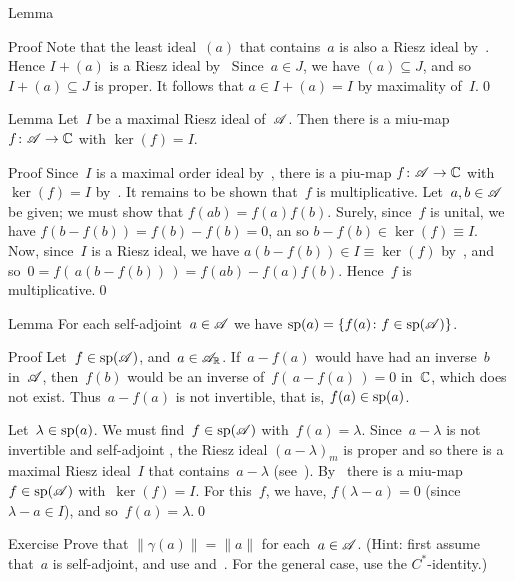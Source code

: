 \documentclass[main]{subfiles}
\begin{document}
\begin{parsec}
\begin{point}{Lemma}
\begin{point}{Proof}
Note that the least ideal~$(a)$ that contains~$a$
is also a Riesz ideal by~.
Hence  $I+(a)$ is a Riesz ideal by~
Since~$a\in J$, we have $(a)\subseteq J$,
and so~$I+(a)\subseteq J$ is proper.
It follows that $a\in I+(a)=I$ by maximality of~$I$.\qed
\end{point}
\end{point}
\begin{point}{Lemma}%
Let~$I$ be a maximal Riesz ideal of~$\mathscr{A}$.
Then there is a miu-map $f\colon \mathscr{A}\to \mathbb{C}$
with $\ker(f)=I$.
\begin{point}{Proof}%
Since~$I$ is a maximal order ideal 
by~,
there is a piu-map $f\colon \mathscr{A}\to \mathbb{C}$
with~$\ker(f)=I$ by~.
It remains to be shown that~$f$ is multiplicative.
Let~$a,b\in \mathscr{A}$ be given;
we must show that $f(ab)=f(a)f(b)$.
Surely, since~$f$ is unital,
we have $f(b-f(b))=f(b)-f(b)=0$,
an so $b-f(b)\in \ker(f)\equiv I$.
Now, since~$I$ is a Riesz ideal,
we have $a(b-f(b))\in I\equiv \ker(f)$ by~,
and so~$0=f(\,a(b-f(b))\,)=f(ab)-f(a)f(b)$.
Hence~$f$ is multiplicative.\qed
\end{point}
\end{point}
\begin{point}{Lemma}%
For each self-adjoint~$a\in\mathscr{A}$ 
we have $\mathrm{sp}(a)=\{f(a)\colon f\in\mathrm{sp}(\mathscr{A})\}$.
\begin{point}{Proof}%
Let~$f\in \mathrm{sp}(\mathscr{A})$,
and~$a\in\mathscr{A}_{\mathbb{R}}$.
If~$a-f(a)$ would have had an inverse~$b$ in~$\mathscr{A}$,
then~$f(b)$ would be an inverse
of~$f(\,a-f(a)\,)=0$ in~$\mathbb{C}$,
which does not exist. Thus~$a-f(a)$ is not invertible,
that is, $f(a)\in \mathrm{sp}(a)$.

Let~$\lambda\in\mathrm{sp}(a)$.
We must find~$f\in \mathrm{sp}(\mathscr{A})$ with~$f(a)=\lambda$.
Since~$a-\lambda$ is not invertible
and self-adjoint	,
the Riesz ideal $(a-\lambda)_m$ is proper
and so there is a maximal Riesz ideal~$I$ that contains~$a-\lambda$
(see~).
By~
there is a miu-map $f\in \mathrm{sp}(\mathscr{A})$ with~$\ker(f)=I$.
For this~$f$,
we have, $f(\lambda-a)=0$
(since $\lambda-a\in I$),
and so~$f(a)=\lambda$.\qed

\end{point}
\end{point}
\begin{point}{Exercise}%
Prove that $\|\gamma(a)\|=\|a\|$
for each~$a\in\mathscr{A}$.
(Hint: first assume that~$a$ is self-adjoint,
and use  and~.
For the general case,
use the $C^*$-identity.)


\end{point}
\end{parsec}
\end{document}
